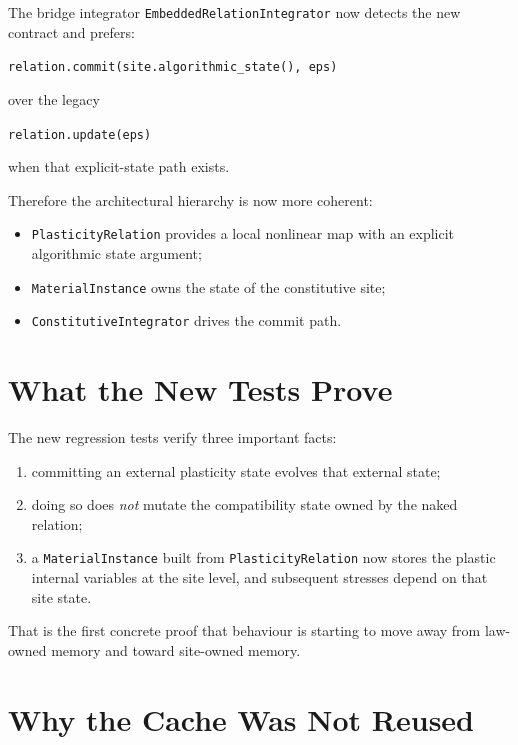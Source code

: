 The bridge integrator \texttt{EmbeddedRelationIntegrator} now detects the new
contract and prefers:

\begin{center}
\texttt{relation.commit(site.algorithmic\_state(), eps)}
\end{center}

over the legacy

\begin{center}
\texttt{relation.update(eps)}
\end{center}

when that explicit-state path exists.

Therefore the architectural hierarchy is now more coherent:

\begin{itemize}
  \item \texttt{PlasticityRelation} provides a local nonlinear map with an
        explicit algorithmic state argument;
  \item \texttt{MaterialInstance} owns the state of the constitutive site;
  \item \texttt{ConstitutiveIntegrator} drives the commit path.
\end{itemize}

\section{What the New Tests Prove}

The new regression tests verify three important facts:

\begin{enumerate}
  \item committing an external plasticity state evolves that external state;
  \item doing so does \emph{not} mutate the compatibility state owned by the
        naked relation;
  \item a \texttt{MaterialInstance} built from \texttt{PlasticityRelation} now
        stores the plastic internal variables at the site level, and subsequent
        stresses depend on that site state.
\end{enumerate}

That is the first concrete proof that behaviour is starting to move away from
law-owned memory and toward site-owned memory.

\section{Why the Cache Was Not Reused}

